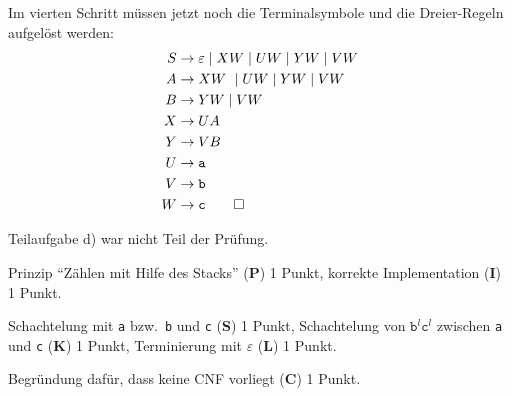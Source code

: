 \begin{loesung}
\begin{teilaufgaben}
Im vierten Schritt müssen jetzt noch die Terminalsymbole und die 
Dreier-Regeln aufgelöst werden:
\begin{align*}
S&\rightarrow \varepsilon \;|\; XW \;|\; UW \;|\; YW \;|\; VW \\
A&\rightarrow X W \;|\; UW \;|\; YW \;|\; VW \\
B&\rightarrow YW \;|\; VW \\
X&\rightarrow UA \\
Y&\rightarrow VB \\
U&\rightarrow \texttt{a} \\
V&\rightarrow \texttt{b} \\
W&\rightarrow \texttt{c}
\qedhere
\end{align*}
\end{teilaufgaben}
\end{loesung}

\begin{diskussion}
Teilaufgabe d) war nicht Teil der Prüfung.
\end{diskussion}

\begin{bewertung}
\begin{teilaufgaben}
\item Prinzip ``Zählen mit Hilfe des Stacks'' ({\bf P}) 1 Punkt,
korrekte Implementation ({\bf I}) 1 Punkt.
\item 
Schachtelung mit \texttt{a} bzw.~\texttt{b} und \texttt{c} ({\bf S}) 1 Punkt,
Schachtelung von $\texttt{b}^l\texttt{c}^l$ zwischen \texttt{a} und \texttt{c}
({\bf K}) 1 Punkt,
Terminierung mit $\varepsilon$ ({\bf L}) 1 Punkt.
\item
Begründung dafür, dass keine CNF vorliegt ({\bf C}) 1 Punkt.
\end{teilaufgaben}
\end{bewertung}
